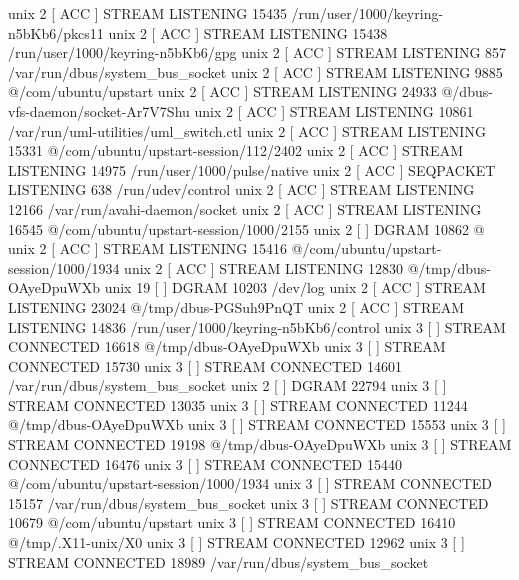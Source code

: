unix  2      [ ACC ]     STREAM     LISTENING     15435    /run/user/1000/keyring-n5bKb6/pkcs11
unix  2      [ ACC ]     STREAM     LISTENING     15438    /run/user/1000/keyring-n5bKb6/gpg
unix  2      [ ACC ]     STREAM     LISTENING     857      /var/run/dbus/system_bus_socket
unix  2      [ ACC ]     STREAM     LISTENING     9885     @/com/ubuntu/upstart
unix  2      [ ACC ]     STREAM     LISTENING     24933    @/dbus-vfs-daemon/socket-Ar7V7Shu
unix  2      [ ACC ]     STREAM     LISTENING     10861    /var/run/uml-utilities/uml_switch.ctl
unix  2      [ ACC ]     STREAM     LISTENING     15331    @/com/ubuntu/upstart-session/112/2402
unix  2      [ ACC ]     STREAM     LISTENING     14975    /run/user/1000/pulse/native
unix  2      [ ACC ]     SEQPACKET  LISTENING     638      /run/udev/control
unix  2      [ ACC ]     STREAM     LISTENING     12166    /var/run/avahi-daemon/socket
unix  2      [ ACC ]     STREAM     LISTENING     16545    @/com/ubuntu/upstart-session/1000/2155
unix  2      [ ]         DGRAM                    10862    @%
unix  2      [ ACC ]     STREAM     LISTENING     15416    @/com/ubuntu/upstart-session/1000/1934
unix  2      [ ACC ]     STREAM     LISTENING     12830    @/tmp/dbus-OAyeDpuWXb
unix  19     [ ]         DGRAM                    10203    /dev/log
unix  2      [ ACC ]     STREAM     LISTENING     23024    @/tmp/dbus-PGSuh9PnQT
unix  2      [ ACC ]     STREAM     LISTENING     14836    /run/user/1000/keyring-n5bKb6/control
unix  3      [ ]         STREAM     CONNECTED     16618    @/tmp/dbus-OAyeDpuWXb
unix  3      [ ]         STREAM     CONNECTED     15730    
unix  3      [ ]         STREAM     CONNECTED     14601    /var/run/dbus/system_bus_socket
unix  2      [ ]         DGRAM                    22794    
unix  3      [ ]         STREAM     CONNECTED     13035    
unix  3      [ ]         STREAM     CONNECTED     11244    @/tmp/dbus-OAyeDpuWXb
unix  3      [ ]         STREAM     CONNECTED     15553    
unix  3      [ ]         STREAM     CONNECTED     19198    @/tmp/dbus-OAyeDpuWXb
unix  3      [ ]         STREAM     CONNECTED     16476    
unix  3      [ ]         STREAM     CONNECTED     15440    @/com/ubuntu/upstart-session/1000/1934
unix  3      [ ]         STREAM     CONNECTED     15157    /var/run/dbus/system_bus_socket
unix  3      [ ]         STREAM     CONNECTED     10679    @/com/ubuntu/upstart
unix  3      [ ]         STREAM     CONNECTED     16410    @/tmp/.X11-unix/X0
unix  3      [ ]         STREAM     CONNECTED     12962    
unix  3      [ ]         STREAM     CONNECTED     18989    /var/run/dbus/system_bus_socket
